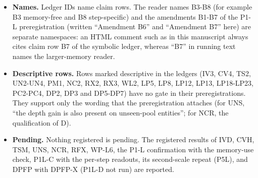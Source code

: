 \begin{landscape}
\begin{itemize}[leftmargin=1.4em,itemsep=2pt,topsep=3pt]
hops are reported as measured cells (S7, B6, H1-H6, JS3), not as extrapolation claims. No claim is
made about multiple reads in the language model at rank32. The language-model results cover Qwen3-0.6B-Base and, for P5L only,
Qwen3-1.7B-Base; no claim is made for another size or as a trend across the two (LP20).
\item \textbf{Names.} Ledger IDs name claim rows. The reader names B3-B8 (for example B3 memory-free and B8
step-specific) and the amendments B1-B7 of the P1-L preregistration (written “Amendment B6” and
“Amendment B7” here) are separate namespaces: an HTML comment such as \texttt{} in this manuscript  %
always cites claim row B7 of the symbolic ledger, whereas “B7” in running text names the
larger-memory reader.
\item \textbf{Descriptive rows.} Rows marked descriptive in the ledgers (IV3, CV4, TS2, UN2-UN4, PM1, NC2, RX2, RX3,
WL2, LP5, LP8, LP12, LP13, LP18-LP23, PC2-PC4, DP2, DP3 and DP5-DP7) have no gate in their preregistrations. They support only the wording that the preregistration
attaches (for UNS, “the depth gain is also present on unseen-pool entities”; for NCR, the qualification of D).
\item \textbf{Pending.} Nothing registered is pending. The registered results of IVD, CVH, TSM, UNS, NCR, RFX, WP-L6, the P1-L
confirmation with the memory-use check, P1L-C with the per-step readouts, its second-scale repeat (P5L), and DPFP with DPFP-X (P1L-D not run) are reported.
\end{itemize}


\end{landscape}
